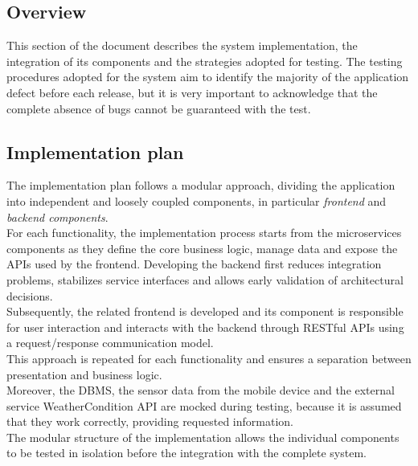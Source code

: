 \subsection{Overview}
This section of the document describes the system implementation, the integration of its components and the strategies adopted for testing. The testing procedures adopted for the system aim to identify the majority of the application defect before each release, but it is very important to acknowledge that the complete absence of bugs cannot be guaranteed with the test. 
\subsection{Implementation plan} 
The implementation plan follows a modular approach, dividing the application into independent and loosely coupled components, in particular \textit{frontend} and \textit{backend components}.\\[5pt]
For each functionality, the implementation process starts from the microservices components as they define the core business logic, manage data and expose the APIs used by the frontend. Developing the backend first reduces integration problems, stabilizes service interfaces and allows early validation of architectural decisions.\\[5pt]
Subsequently, the related frontend is developed and its component is responsible for user interaction and interacts with the backend through RESTful APIs using a request/response communication model. \\[5pt]
This approach is repeated for each functionality and ensures a separation between presentation and business logic. \\[5pt]
Moreover, the DBMS, the sensor data from the mobile device and the external service WeatherCondition API are mocked during testing, because it is assumed that they work correctly, providing requested information.\\[5pt]
The modular structure of the implementation allows the individual components to be tested in isolation before the integration with the complete system.
